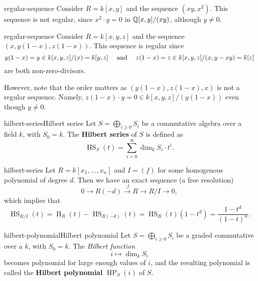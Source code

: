 \begin{example}{regular-sequence}
    Consider $R = k[x, y]$ and the sequence $(xy, x^2)$. This sequence is not regular, since $x^2 \cdot y = 0$ in $\mathbb{Q}[x, y] / (xy)$, although $y \ne 0$.
\end{example}

\begin{example}{regular-sequence}
    Consider $R = k[x, y, z]$ and the sequence $(x, y(1 - x), z(1 - x))$. This sequence is regular since
    \[ y(1 - x) = y \in k[x, y, z]/(x) = k[y, z] \quad \textup{ and } \quad z(1 - x) = z \in k[x, y, z]/(x, y - xy) = k[z] \]
    are both non-zero-divisors.
    
    However, note that the order matters as $(y(1 - x), z(1 - x), x)$ is not a regular sequence. Namely, $z(1 - x) \cdot y = 0 \in k[x, y, z] / (y(1 - x))$ even though $y \ne 0$.
\end{example}

\begin{topic}{hilbert-series}{Hilbert series}
    Let $S = \bigoplus_{i \ge 0} S_i$ be a   commutative algebra over a field $k$, with $S_0 = k$. The \textbf{Hilbert series} of $S$ is defined as
    \[ \operatorname{HS}_S(t) = \sum_{i = 0}^{\infty} \dim_k S_i \cdot t^i . \]
\end{topic}

\begin{example}{hilbert-series}
    Let $R = k[x_1, \ldots, x_n]$ and $I = (f)$ for some homogenous polynomial of degree $d$. Then we have an exact sequence (a free resolution)
    \[ 0 \to R(-d) \xrightarrow{\cdot f} R \to R / I \to 0 , \]
    which implies that
    \[ \operatorname{HS}_{R/I}(t) = \operatorname{H}_R(t) - \operatorname{HS}_{R(-d)}(t) = \operatorname{HS}_R(t) (1 - t^d) = \frac{1 - t^d}{(1 - t)^n}. \]
\end{example}

\begin{topic}{hilbert-polynomial}{Hilbert polynomial}
    Let $S = \bigoplus_{i \ge 0} S_i$ be a  graded commutative  over a  $k$, with $S_0 = k$. The \textit{Hilbert function}
    \[ i \mapsto \dim_k S_i \]
    becomes polynomial for large enough values of $i$, and the resulting polynomial is called the \textbf{Hilbert polynomial} $\operatorname{HP}_S(i)$ of $S$.
\end{topic}

